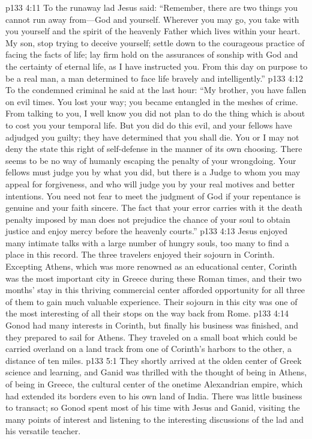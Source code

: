 \pc \vs p133 4:11 To the runaway lad Jesus said: \textcolor{ubdarkred}{“Remember, there are two things you cannot run away from---God and yourself. Wherever you may go, you take with you yourself and the spirit of the heavenly Father which lives within your heart. My son, stop trying to deceive yourself; settle down to the courageous practice of facing the facts of life; lay firm hold on the assurances of sonship with God and the certainty of eternal life, as I have instructed you. From this day on purpose to be a real man, a man determined to face life bravely and intelligently.”}
\pc \vs p133 4:12 To the condemned criminal he said at the last hour: \textcolor{ubdarkred}{“My brother, you have fallen on evil times. You lost your way; you became entangled in the meshes of crime. From talking to you, I well know you did not plan to do the thing which is about to cost you your temporal life. But you did do this evil, and your fellows have adjudged you guilty; they have determined that you shall die. You or I may not deny the state this right of self\hyp{}defense in the manner of its own choosing. There seems to be no way of humanly escaping the penalty of your wrongdoing. Your fellows must judge you by what you did, but there is a Judge to whom you may appeal for forgiveness, and who will judge you by your real motives and better intentions. You need not fear to meet the judgment of God if your repentance is genuine and your faith sincere. The fact that your error carries with it the death penalty imposed by man does not prejudice the chance of your soul to obtain justice and enjoy mercy before the heavenly courts.”}
\pc \vs p133 4:13 Jesus enjoyed many intimate talks with a large number of hungry souls, too many to find a place in this record. The three travelers enjoyed their sojourn in Corinth. Excepting Athens, which was more renowned as an educational center, Corinth was the most important city in Greece during these Roman times, and their two months’ stay in this thriving commercial center afforded opportunity for all three of them to gain much valuable experience. Their sojourn in this city was one of the most interesting of all their stops on the way back from Rome.
\vs p133 4:14 Gonod had many interests in Corinth, but finally his business was finished, and they prepared to sail for Athens. They traveled on a small boat which could be carried overland on a land track from one of Corinth’s harbors to the other, a distance of ten miles.
\vs p133 5:1 They shortly arrived at the olden center of Greek science and learning, and Ganid was thrilled with the thought of being in Athens, of being in Greece, the cultural center of the onetime Alexandrian empire, which had extended its borders even to his own land of India. There was little business to transact; so Gonod spent most of his time with Jesus and Ganid, visiting the many points of interest and listening to the interesting discussions of the lad and his versatile teacher.
